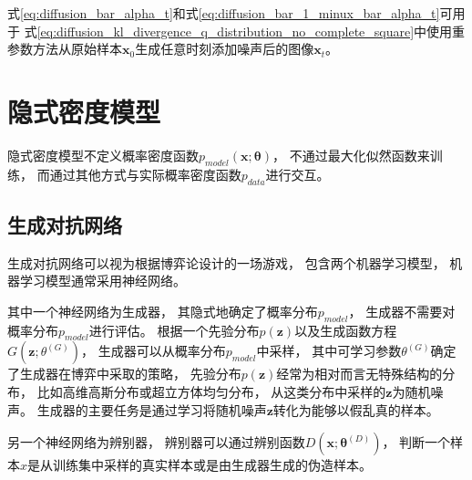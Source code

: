 式{\ref{eq:diffusion_bar_alpha_t}}和式{\ref{eq:diffusion_bar_1_minux_bar_alpha_t}}可用于
式{\ref{eq:diffusion_kl_divergence_q_distribution_no_complete_square}}中使用重参数方法从原始样本{$\bm{x}_{0}$}生成任意时刻添加噪声后的图像{$\bm{x}_{t}$}。








\section{隐式密度模型}\label{section:implicit_density_model}
隐式密度模型不定义概率密度函数{$p_{model}(\bm{x};\bm{\theta})$}，
不通过最大化似然函数来训练，
而通过其他方式与实际概率密度函数{$p_{data}$}进行交互。
\subsection{生成对抗网络}
生成对抗网络可以视为根据博弈论设计的一场游戏，
包含两个机器学习模型，
机器学习模型通常采用神经网络。

其中一个神经网络为生成器，
其隐式地确定了概率分布{$p_{model}$}，
生成器不需要对概率分布{$p_{model}$}进行评估。
根据一个先验分布{$p(\bm{z})$}以及生成函数方程{$G(\bm{z};\theta^{(G)})$}，
生成器可以从概率分布{$p_{model}$}中采样，
其中可学习参数{$\theta^{(G)}$}确定了生成器在博弈中采取的策略，
先验分布{$p(\bm{z})$}经常为相对而言无特殊结构的分布，
比如高维高斯分布或超立方体均匀分布，
从这类分布中采样的{$\bm{z}$}为随机噪声。
生成器的主要任务是通过学习将随机噪声{$\bm{z}$}转化为能够以假乱真的样本。

另一个神经网络为辨别器，
辨别器可以通过辨别函数{$D(\bm{x};\bm{\theta}^{(D)})$}，
判断一个样本{$x$}是从训练集中采样的真实样本或是由生成器生成的伪造样本。





